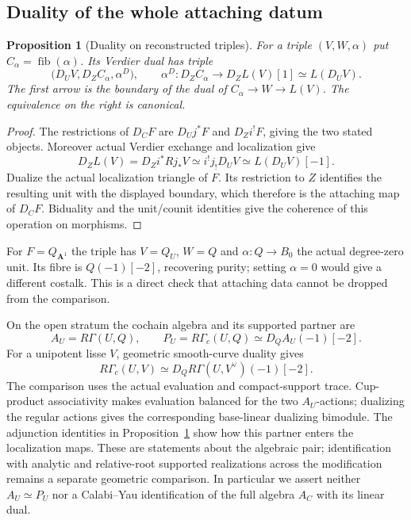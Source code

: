 \documentclass[11pt]{article}
\newtheorem{proposition}[theorem]{Proposition}
\theoremstyle{definition}
\theoremstyle{remark}
\begin{document}
\subsection{Duality of the whole attaching datum}
\begin{proposition}[Duality on reconstructed triples]\label{prop:dual-triple}
For a triple $(V,W,\alpha)$ put $C_\alpha=\operatorname{fib}(\alpha)$.
Its Verdier dual has triple
\[
 \bigl(D_UV,D_Z C_\alpha,\alpha^D\bigr),
 \qquad
 \alpha^D:D_Z C_\alpha\longrightarrow D_ZL(V)[1]
                      \simeq L(D_UV).
\]
The first arrow is the boundary of the dual of
$C_\alpha\to W\to L(V)$.  The equivalence on the right is canonical.
\end{proposition}
\begin{proof}
The restrictions of $D_CF$ are $D_Uj^*F$ and $D_Zi^!F$, giving the two
stated objects.  Moreover actual Verdier exchange and localization give
\[
 D_ZL(V)=D_Zi^*Rj_*V
 \simeq i^!j_!D_UV\simeq L(D_UV)[-1].
\]
Dualize the actual localization triangle of $F$.  Its restriction to
$Z$ identifies the resulting unit with the displayed boundary, which
therefore is the attaching map of $D_CF$.  Biduality and the unit/counit
identities give the coherence of this operation on morphisms.
\end{proof}

For $F=Q_{\mathbf A^1}$ the triple has $V=Q_U$, $W=Q$ and
$\alpha:Q\to B_0$ the actual degree-zero unit.  Its fibre is
$Q(-1)[-2]$, recovering purity; setting $\alpha=0$ would give a
different costalk.  This is a direct check that attaching data cannot
be dropped from the comparison.

On the open stratum the cochain algebra and its supported partner are
\[
 A_U=R\Gamma(U,Q),\qquad
 P_U=R\Gamma_c(U,Q)\simeq D_Q A_U(-1)[-2].
\]
For a unipotent lisse $V$, geometric smooth-curve duality gives
\[
 R\Gamma_c(U,V)\simeq D_Q R\Gamma(U,V^\vee)(-1)[-2].
\]
The comparison uses the actual evaluation and compact-support trace.
Cup-product associativity makes evaluation balanced for the two
$A_U$-actions; dualizing the regular actions gives the corresponding
base-linear dualizing bimodule.  The adjunction identities in
Proposition~\ref{prop:dual-triple} show how this partner enters the
localization maps.  These are statements about the algebraic pair;
identification with analytic and relative-root supported realizations
across the modification remains a separate geometric comparison.
In particular we assert neither $A_U\simeq P_U$ nor a Calabi--Yau
identification of the full algebra $A_C$ with its linear dual.
\end{document}
